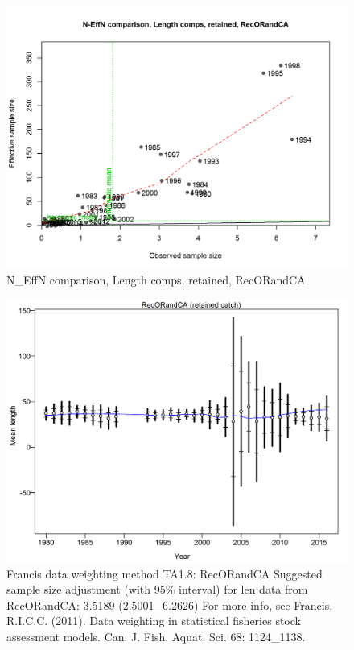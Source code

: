 \documentclass[12pt,]{article}
\begin{document}
\begin{figure}[htbp]
\centering
\includegraphics{./r4ss/plots_mod1/comp_lenfit_sampsize_flt3mkt2.png}
\caption{N\_EffN comparison, Length comps, retained, RecORandCA
\label{fig:mod1_16_comp_lenfit_sampsize_flt3mkt2}}
\end{figure}

\begin{figure}[htbp]
\centering
\includegraphics{./r4ss/plots_mod1/comp_lenfit_data_weighting_TA1.8_RecORandCA.png}
\caption{Francis data weighting method TA1.8: RecORandCA Suggested
sample size adjustment (with 95\% interval) for len data from
RecORandCA: 3.5189 (2.5001\_6.2626) For more info, see Francis, R.I.C.C.
(2011). Data weighting in statistical fisheries stock assessment models.
Can. J. Fish. Aquat. Sci. 68: 1124\_1138.
\label{fig:mod1_17_comp_lenfit_data_weighting_TA1.8_RecORandCA}}
\end{figure}
\end{document}
